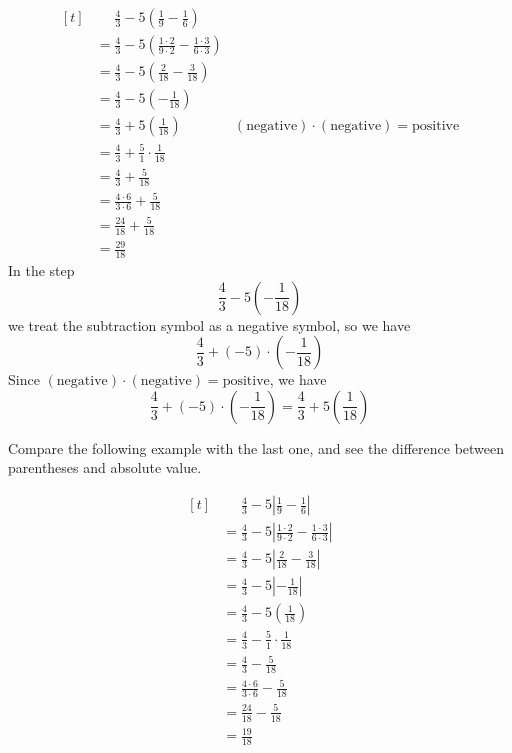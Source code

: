 \begin{myexample}
\[
\begin{aligned}[t]
	&\phantom{{}=} \frac{4}{3}-5(\frac{1}{9}-\frac{1}{6}) \\
	&= \frac{4}{3}-5(\frac{1\cdot2}{9\cdot2}-\frac{1\cdot3}{6\cdot3}) \\
	&= \frac{4}{3}-5(\frac{2}{18}-\frac{3}{18}) \\
	&= \frac{4}{3}-5(-\frac{1}{18}) \\
	&= \frac{4}{3}+5(\frac{1}{18}) &(\text{negative})\cdot(\text{negative})=\text{positive}\\
	&= \frac{4}{3}+\frac{5}{1} \cdot \frac{1}{18} \\
	&= \frac{4}{3}+\frac{5}{18} \\
	&= \frac{4\cdot6}{3\cdot6}+\frac{5}{18} \\
	&= \frac{24}{18}+\frac{5}{18} \\
	&= \frac{29}{18}
\end{aligned}
\]
In the step 
\[ \frac{4}{3}-5(-\frac{1}{18}) \] 
we treat the subtraction symbol as a negative symbol, so we have 
\[ \frac{4}{3}+(-5)\cdot(-\frac{1}{18}) \]
Since $(\text{negative})\cdot(\text{negative})=\text{positive}$, we have 
\[ \frac{4}{3}+(-5)\cdot(-\frac{1}{18})=\frac{4}{3}+5(\frac{1}{18}) \]
\end{myexample}

\begin{myexample}
Compare the following example with the last one, and see the difference between parentheses and absolute value.

\[
\begin{aligned}[t]
	&\phantom{{}=} \frac{4}{3}-5 \left| \frac{1}{9}-\frac{1}{6} \right| \\
	&= \frac{4}{3}-5 \left| \frac{1\cdot2}{9\cdot2}-\frac{1\cdot3}{6\cdot3} \right| \\
	&= \frac{4}{3}-5 \left| \frac{2}{18}-\frac{3}{18} \right| \\
	&= \frac{4}{3}-5 \left| -\frac{1}{18} \right| \\
	&= \frac{4}{3}-5(\frac{1}{18}) \\
	&= \frac{4}{3}-\frac{5}{1} \cdot \frac{1}{18} \\
	&= \frac{4}{3}-\frac{5}{18} \\
	&= \frac{4\cdot6}{3\cdot6}-\frac{5}{18} \\
	&= \frac{24}{18}-\frac{5}{18} \\
	&= \frac{19}{18}
\end{aligned}
\]
\end{myexample}

